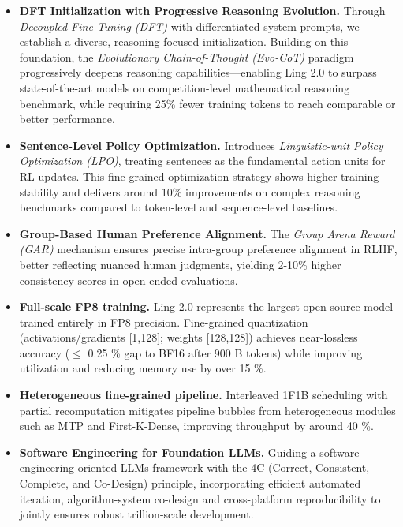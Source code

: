 \begin{itemize}
  \item \textbf{DFT Initialization with Progressive Reasoning Evolution.} Through \textit{Decoupled Fine-Tuning (DFT)} with differentiated system prompts, we establish a diverse, reasoning-focused initialization. Building on this foundation, the \textit{Evolutionary Chain-of-Thought (Evo-CoT)} paradigm progressively deepens reasoning capabilities—enabling Ling 2.0 to surpass state-of-the-art models on competition-level mathematical reasoning benchmark, while requiring 25\% fewer training tokens to reach comparable or better performance.
  \item \textbf{Sentence-Level Policy Optimization.} Introduces \textit{Linguistic-unit Policy Optimization (LPO)}, treating sentences as the fundamental action units for RL updates. This fine-grained optimization strategy shows higher training stability and delivers around 10\% improvements on complex reasoning benchmarks compared to token-level and sequence-level baselines. 
  \item  \textbf{Group-Based Human Preference Alignment.} The \textit{Group Arena Reward (GAR)} mechanism ensures precise intra-group preference alignment in RLHF, better reflecting nuanced human judgments, yielding 2-10\% higher consistency scores in open-ended evaluations.
\end{itemize}

\begin{itemize}
  \item \textbf{Full-scale FP8 training.} Ling 2.0 represents the largest open-source model trained entirely in FP8 precision. Fine-grained quantization (activations/gradients [1,128]; weights [128,128]) achieves near-lossless accuracy ($\leq$ 0.25 \% gap to BF16 after 900 B tokens) while improving utilization and reducing memory use by over 15 \%.  
  \item \textbf{Heterogeneous fine-grained pipeline.} Interleaved 1F1B scheduling with partial recomputation mitigates pipeline bubbles from heterogeneous modules such as MTP and First-K-Dense, improving throughput by around 40 \%.  
  \item \textbf{Software Engineering for Foundation LLMs.} Guiding a software-engineering-oriented LLMs framework with the 4C (Correct, Consistent, Complete, and Co-Design) principle, incorporating efficient automated iteration, algorithm-system co-design and cross-platform reproducibility to jointly ensures robust trillion-scale development.
\end{itemize}


